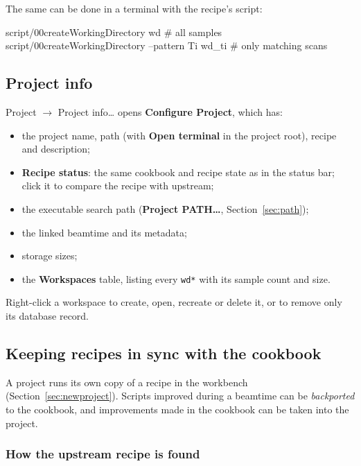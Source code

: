 \documentclass[11pt,a4paper]{article}
\newcommand{\cmd}[1]{\texttt{#1}}
\newcommand{\ui}[1]{\textsf{\textbf{#1}}}
\newcommand{\menu}[1]{\textsf{#1}}
\begin{document}
The same can be done in a terminal with the recipe's script:

\begin{terminal}
script/00createWorkingDirectory wd                        # all samples
script/00createWorkingDirectory --pattern Ti wd_ti        # only matching scans
\end{terminal}

\subsection{Project info}

\menu{Project $\rightarrow$ Project info\ldots} opens \ui{Configure Project}, which has:
\begin{itemize}
  \item the project name, path (with \ui{Open terminal} in the project root), recipe and description;
  \item \ui{Recipe status}: the same cookbook and recipe state as in the status bar; click it to
    compare the recipe with upstream;
  \item the executable search path (\ui{Project PATH\ldots}, Section~\ref{sec:path});
  \item the linked beamtime and its metadata;
  \item storage sizes;
  \item the \ui{Workspaces} table, listing every \cmd{wd*} with its sample count and size.
\end{itemize}
Right-click a workspace to create, open, recreate or delete it, or to remove only its database
record.

\subsection{Keeping recipes in sync with the cookbook}\label{sec:recipesync}

A project runs its own copy of a recipe in the workbench (Section~\ref{sec:newproject}). Scripts
improved during a beamtime can be \emph{backported} to the cookbook, and improvements made in the
cookbook can be taken into the project.

\subsubsection*{How the upstream recipe is found}
\end{document}

